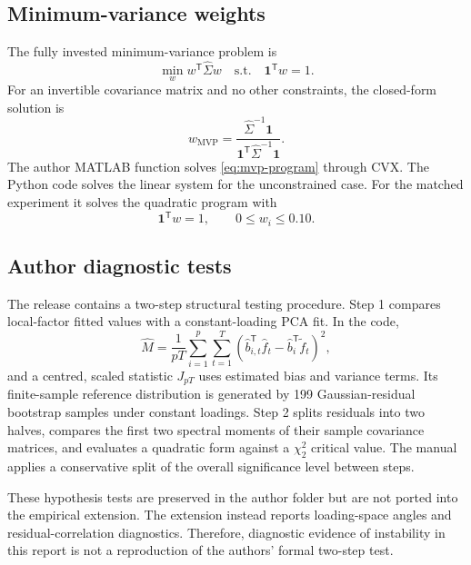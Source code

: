 \documentclass[11pt,a4paper]{article}
\newcommand{\one}{\bm{1}}
\newcommand{\wh}{\widehat}
\newcommand{\trans}{^{\mathsf T}}
\begin{document}
\subsection{Minimum-variance weights}

The fully invested minimum-variance problem is
\begin{equation}
 \min_w w\trans\wh\Sigma w
 \quad\text{s.t.}\quad \one\trans w=1.
 \label{eq:mvp-program}
\end{equation}
For an invertible covariance matrix and no other constraints, the closed-form solution is
\begin{equation}
 w_{\text{MVP}}=\frac{\wh\Sigma^{-1}\one}{\one\trans\wh\Sigma^{-1}\one}.
 \label{eq:mvp-closed}
\end{equation}
The author MATLAB function solves \eqref{eq:mvp-program} through CVX. The Python code solves the linear system for the unconstrained case. For the matched experiment it solves the quadratic program with
\begin{equation}
 \one\trans w=1,\qquad 0\le w_i\le0.10.
 \label{eq:matched-constraints}
\end{equation}

\subsection{Author diagnostic tests}

The release contains a two-step structural testing procedure. Step 1 compares local-factor fitted values with a constant-loading PCA fit. In the code,
\begin{equation}
 \wh M=\frac{1}{pT}\sum_{i=1}^{p}\sum_{t=1}^{T}
 \left(\wh b_{i,t}\trans\wh f_t-\wh b_i\trans\widetilde f_t\right)^2,
\end{equation}
and a centred, scaled statistic $J_{pT}$ uses estimated bias and variance terms. Its finite-sample reference distribution is generated by 199 Gaussian-residual bootstrap samples under constant loadings. Step 2 splits residuals into two halves, compares the first two spectral moments of their sample covariance matrices, and evaluates a quadratic form against a $\chi^2_2$ critical value. The manual applies a conservative split of the overall significance level between steps.

These hypothesis tests are preserved in the author folder but are not ported into the empirical extension. The extension instead reports loading-space angles and residual-correlation diagnostics. Therefore, diagnostic evidence of instability in this report is not a reproduction of the authors' formal two-step test.
\end{document}
